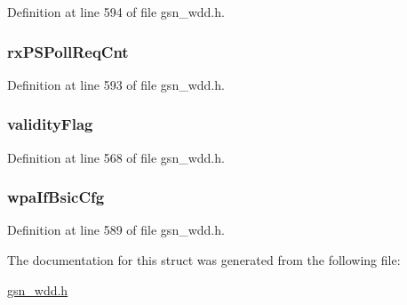 Definition at line 594 of file gsn\_\-wdd.h.

\hypertarget{a00282_ae1c83e85aa9154a9e18cc1c67b25eceb}{
\subsubsection[{rxPSPollReqCnt}]{ {\bf rxPSPollReqCnt}}}
\label{a00282_ae1c83e85aa9154a9e18cc1c67b25eceb}


Definition at line 593 of file gsn\_\-wdd.h.

\hypertarget{a00282_a816407436e0034386b9105d7a178503c}{
\subsubsection[{validityFlag}]{ {\bf validityFlag}}}
\label{a00282_a816407436e0034386b9105d7a178503c}


Definition at line 568 of file gsn\_\-wdd.h.

\hypertarget{a00282_ab7ebd92c07a37e5734d4a013a626c921}{
\subsubsection[{wpaIfBsicCfg}]{ {\bf wpaIfBsicCfg}}}
\label{a00282_ab7ebd92c07a37e5734d4a013a626c921}


Definition at line 589 of file gsn\_\-wdd.h.



The documentation for this struct was generated from the following file:\begin{DoxyCompactItemize}
\item 
\hyperlink{a00603}{gsn\_\-wdd.h}\end{DoxyCompactItemize}
